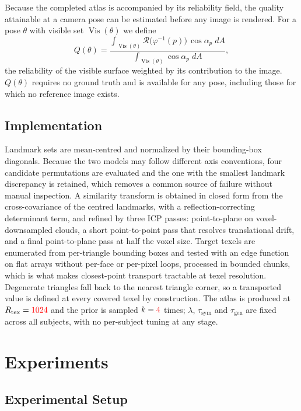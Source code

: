 \documentclass[runningheads]{llncs}
\newcommand{\Vis}{\operatorname{Vis}}
\newcommand{\Rel}{\mathcal{R}}
\newcommand{\PH}[1]{\textcolor{red}{#1}}
\begin{document}
Because the completed atlas is accompanied by its reliability field, the
quality attainable at a camera pose can be estimated before any image is
rendered. For a pose $\theta$ with visible set $\Vis(\theta)$ we define
\begin{equation}
  Q(\theta) = \frac{\displaystyle\int_{\Vis(\theta)}
        \Rel\bigl(\varphi^{-1}(p)\bigr)\,\cos\alpha_p \; dA}
       {\displaystyle\int_{\Vis(\theta)} \cos\alpha_p \; dA},
  \label{eq:vqp}
\end{equation}
the reliability of the visible surface weighted by its contribution to the
image. $Q(\theta)$ requires no ground truth and is available for any pose,
including those for which no reference image exists.

\subsection{Implementation}
\label{sec:impl}

Landmark sets are mean-centred and normalized by their bounding-box diagonals.
Because the two models may follow different axis conventions, four candidate
permutations are evaluated and the one with the smallest landmark discrepancy
is retained, which removes a common source of failure without manual
inspection. A similarity transform is obtained in closed form from the
cross-covariance of the centred landmarks, with a reflection-correcting
determinant term, and refined by three ICP passes: point-to-plane on
voxel-downsampled clouds, a short point-to-point pass that resolves
translational drift, and a final point-to-plane pass at half the voxel size.
Target texels are enumerated from per-triangle bounding boxes and tested with
an edge function on flat arrays without per-face or per-pixel loops, processed
in bounded chunks, which is what makes closest-point transport tractable at
texel resolution. Degenerate triangles fall back to the nearest triangle
corner, so a transported value is defined at every covered texel by
construction. The atlas is produced at $R_{\text{tex}} = \PH{1024}$ and the
prior is sampled $k = \PH{4}$ times; $\lambda$, $\tau_{\text{sym}}$ and
$\tau_{\text{gen}}$ are fixed across all subjects, with no per-subject tuning
at any stage.

\section{Experiments}
\label{sec:exp}

\subsection{Experimental Setup}
\label{sec:protocol}
\end{document}
